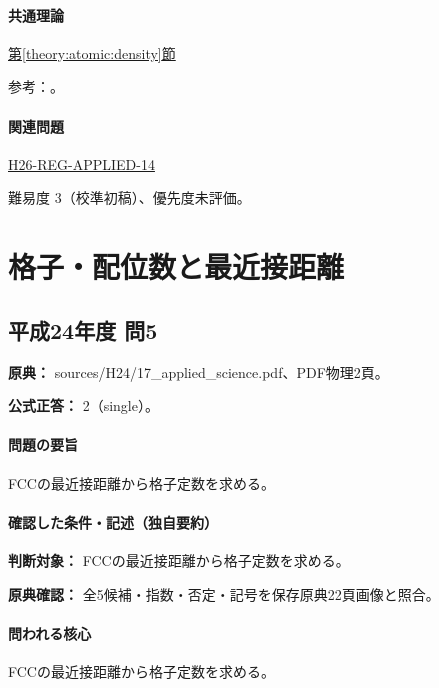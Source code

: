\paragraph{共通理論} \hyperref[theory:atomic:density]{第\ref*{theory:atomic:density}節}

\par 参考：\cite{openstax_crystals}。

\paragraph{関連問題} \hyperref[q:h26-reg-applied-14]{H26-REG-APPLIED-14}

\par 難易度 3（校準初稿）、優先度未評価。

\section{格子・配位数と最近接距離}

\subsection{平成24年度 問5}
\label{q:h24-reg-applied-05}

\noindent\textbf{原典：} sources/H24/17\_applied\_science.pdf、PDF物理2頁。

\textbf{公式正答：} 2（single）。

\paragraph{問題の要旨} FCCの最近接距離から格子定数を求める。

\paragraph{確認した条件・記述（独自要約）}\mbox{}\par

\noindent\textbf{判断対象：} FCCの最近接距離から格子定数を求める。\par

\noindent\textbf{原典確認：} 全5候補・指数・否定・記号を保存原典22頁画像と照合。\par

\paragraph{問われる核心} FCCの最近接距離から格子定数を求める。

